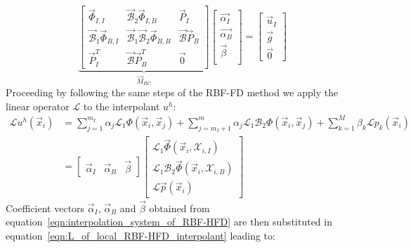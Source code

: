 \begin{equation}
\label{eqn:interpolation_system_of_RBF-HFD}
\underbrace{
\begin{bmatrix}
	\vec{\Phi}_{I,I}  					  &  \vec{\mathcal{B}}_2 \vec{\Phi}_{I,B}  					   &  \vec{P}_I  			   \\
	\vec{\mathcal{B}}_1 \vec{\Phi}_{B,I}  &  \vec{\mathcal{B}}_1 \vec{\mathcal{B}}_2 \vec{\Phi}_{B,B}  &  \vec{\mathcal{B}} \vec{P}_B  \\
	\vec{P}_I^T							  &  \vec{\mathcal{B}} \vec{P}_B^T						 	   &  \vec{0}					
\end{bmatrix}}_{\vec{M}_{BC}}
\begin{bmatrix}
	\vec{\alpha_I}  \\
	\vec{\alpha_B}  \\
	\vec{\beta}  	\\
\end{bmatrix} = 
\begin{bmatrix}
	\vec{u}_I  \\
	\vec{g}    \\
	\vec{0}
\end{bmatrix}
\end{equation}
Proceeding by following the same steps of the RBF-FD method we apply the linear operator $\mathcal{L}$ to the interpolant $u^h$:
\begin{equation}
	\label{eqn:L_of_local_RBF-HFD_interpolant}
	\begin{aligned}
		\mathcal{L} u^h(\vec{x}_i) & = \sum_{j=1}^{m_I} \alpha_j \mathcal{L}_1 \Phi(\vec{x}_i, \vec{x}_j) + \sum_{j=m_I+1}^{m} \alpha_j \mathcal{L}_1 \mathcal{B}_2 \Phi(\vec{x}_i, \vec{x}_j) + \sum_{k=1}^{M} \beta_k \mathcal{L} p_k(\vec{x}_i)  \\
		& = \begin{bmatrix}
			\vec{\alpha}_I & \vec{\alpha}_B & \vec{\beta}
		\end{bmatrix}
		\begin{bmatrix}
			\mathcal{L}_1 \vec{\Phi}(\vec{x}_i, \mathcal{X}_{i,I})  			  \\
			\mathcal{L}_1 \mathcal{B}_2 \vec{\Phi}(\vec{x}_i, \mathcal{X}_{i,B})  \\
			\mathcal{L} \vec{p}(\vec{x}_i)
		\end{bmatrix}	
	\end{aligned}
\end{equation}
Coefficient vectors $\vec{\alpha}_I$, $\vec{\alpha}_B$ and $\vec{\beta}$ obtained from equation~\eqref{eqn:interpolation_system_of_RBF-HFD} are then substituted in equation~\eqref{eqn:L_of_local_RBF-HFD_interpolant} leading to:
